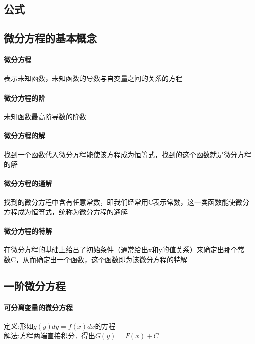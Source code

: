 \documentclass{article}
\begin{document}
\begin{flushleft}
	\LARGE
	
	\section{公式}
	
	\subsection{微分方程的基本概念}
	
	\paragraph{微分方程}
	表示未知函数，未知函数的导数与自变量之间的关系的方程\\
	\paragraph{微分方程的阶}
	未知函数最高阶导数的阶数\\
	\paragraph{微分方程的解}
	找到一个函数代入微分方程能使该方程成为恒等式，找到的这个函数就是微分方程的解\\
	\paragraph{微分方程的通解}
	找到的微分方程中含有任意常数，即我们经常用C表示常数，这一类函数能使微分方程成为恒等式，统称为微分方程的通解\\
	\paragraph{微分方程的特解}
	在微分方程的基础上给出了初始条件（通常给出x和y的值关系）来确定出那个常数C，从而确定出一个函数，这个函数即为该微分方程的特解\\
	
	\subsection{一阶微分方程}
	
	 \paragraph{可分离变量的微分方程}
	 定义:形如$g(y)dy=f(x)dx$的方程\\
	 解法:方程两端直接积分，得出$G(y)=F(x)+C$\\
	 

\end{flushleft}
\end{document}
